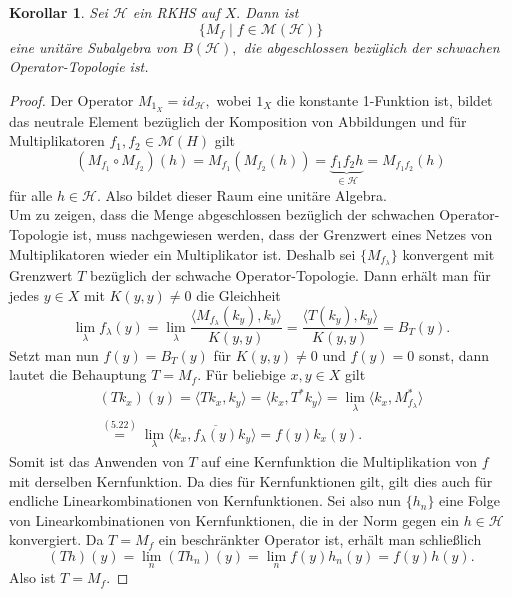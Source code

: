 \documentclass[12pt,titlepage,twoside,cleardoublepage]{article}
\theoremstyle{nummermitklammern}
\newtheorem{korollar}[temp]{Korollar}
\numberwithin{equation}{section}
\newtheorem{korollar}[zahl]{Korollar}
\begin{document}
 \begin{korollar}
 Sei $\mathcal{H}$ ein RKHS auf $X.$ Dann ist 
 \[
\{M_f\mid f\in \mathcal{M}(\mathcal{H})\} 
 \]
 eine unitäre Subalgebra von $B(\mathcal{H}),$ die abgeschlossen bezüglich der schwachen Operator-Topologie ist.
 \end{korollar}
 \begin{proof}
 Der Operator $M_{1_X}=id_{\mathcal{H}},$ wobei $1_X$ die konstante 1-Funktion ist, bildet das neutrale Element bezüglich der Komposition von Abbildungen und für Multiplikatoren $f_1,f_2\in \mathcal{M}(H)$ gilt
\[
(M_{f_1}\circ M_{f_2})(h)=M_{f_1}(M_{f_2}(h))=\underset{\in \mathcal{H}}{\underbrace{f_1f_2h}}=M_{f_1f_2}(h)
\]
für alle $h \in \mathcal{H}.$
Also bildet dieser Raum eine unitäre Algebra.\\
Um zu zeigen, dass die Menge abgeschlossen bezüglich der  schwachen Operator-Topologie ist, muss nachgewiesen werden, dass der Grenzwert eines Netzes von Multiplikatoren wieder ein Multiplikator ist. 
Deshalb sei $\{M_{f_\lambda}\}$ konvergent mit Grenzwert $T$ bezüglich der schwache Operator-Topologie. Dann erhält man für jedes $y \in X$ mit $K(y,y)\neq 0$ die Gleichheit 
\[
\lim_{\lambda}f_\lambda(y)=\lim_{\lambda}\frac{\langle M_{f_{\lambda}}(k_y),k_y\rangle}{K(y,y)}=\frac{\langle T(k_y),k_y\rangle}{K(y,y)}=B_T(y).
\]
Setzt man nun $f(y)=B_T(y)$ für $K(y,y)\neq 0$ und  $f(y)=0$ 
sonst,
dann lautet die Behauptung $T=M_f.$ Für beliebige $x,y\in X$ gilt
\begin{align*}
(Tk_x)(y)=\langle Tk_x,k_y \rangle =\langle k_x,T^*k_y \rangle=\lim_{\lambda}\langle k_x,M^*_{f_\lambda}\rangle\\
\overset{(5.22)}{=}\lim_{\lambda}\langle k_x,\overline{f_\lambda(y)}k_y\rangle=f(y)k_x(y).
\end{align*}
Somit ist das Anwenden von $T$ auf eine Kernfunktion die Multiplikation von $f$ mit derselben Kernfunktion. Da dies für Kernfunktionen gilt, gilt dies auch für endliche Linearkombinationen von Kernfunktionen. Sei also nun $\{h_n\}$ eine Folge von Linearkombinationen von Kernfunktionen, die in der Norm gegen ein $h\in \mathcal{H}$ konvergiert. Da $T=M_f$ ein beschränkter Operator ist, erhält man schließlich 
\[
(Th)(y)=\lim_n(Th_n)(y)=\lim_n f(y)h_n(y)=f(y)h(y).
\] Also ist $T=M_f.$
 \end{proof}
 \newpage
\end{document}
